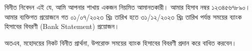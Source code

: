 \documentclass{../bdletter}
\begin{document}
\PrintLetterHeader

বিনীত নিবেদন এই যে, আমি আপনার শাখায় একজন নিয়মিত আমানতকারী। আমার হিসাব
নম্বর ১২৩৪৫৬৭৮৯০। আমার ব্যক্তিগত প্রয়োজনে গত ০১/০৭/২০২৩ খ্রিঃ তারিখ হতে
৩১/১২/২০২৩ খ্রিঃ তারিখ পর্যন্ত সময়ের ব্যাংক হিসাবের বিবরণী (Bank Statement)
প্রয়োজন।

অতএব, মহোদয়ের নিকট বিনীত প্রার্থনা, উপরোক্ত সময়ের ব্যাংক হিসাবের বিবরণী
প্রদান করে বাধিত করবেন।

\PrintLetterFooter
\end{document}
